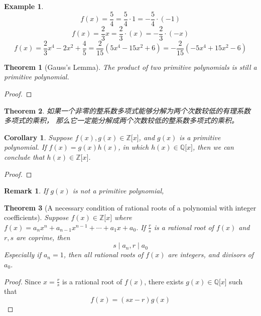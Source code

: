 \documentclass[onecolumn]{ctexart}
\newtheorem{theorem}{Theorem}
\newtheorem{corollary}{Corollary}
\newtheorem{remark}{Remark}
\newtheorem{example}{Example}
\begin{document}
\begin{example}
  \[
    f(x) = \frac{5}{4} = \frac{5}{4} \cdot 1 = -\frac{5}{4} \cdot (-1)
  \]
  \[
    f(x) = \frac{2}{3}x = \frac{2}{3} \cdot (x) = -\frac{2}{3} \cdot (-x)
  \]
  \[
    f(x) = \frac{2}{3}x^4 - 2x^2 + \frac{4}{5} = \frac{2}{15}(5x^4 - 15x^2 + 6) = -\frac{2}{15}(-5x^4 + 15x^2 - 6)
  \]
\end{example}

\begin{theorem}[Gauss's Lemma]
  The product of two primitive polynomials is still a primitive polynomial.
\end{theorem}
\begin{proof}
  
\end{proof}

\begin{theorem}
  如果一个非零的整系数多项式能够分解为两个次数较低的有理系数多项式的乘积，
  那么它一定能分解成两个次数较低的整系数多项式的乘积。
\end{theorem}

\begin{corollary}
  Suppose $f(x), g(x) \in \mathbb{Z}\lbrack x \rbrack$, and $g(x)$ is a 
  primitive polynomial. If $f(x) = g(x)h(x)$, in which $h(x) \in \mathbb{Q}
  \lbrack x \rbrack$, then we can conclude that $h(x) \in \mathbb{Z}\lbrack x 
  \rbrack$.
\end{corollary}
\begin{proof}
  
\end{proof}
\begin{remark}
  If $g(x)$ is not a primitive polynomial,
\end{remark}

\begin{theorem}[A necessary condition of rational roots of a polynomial with integer coefficients]
  Suppose $f(x) \in \mathbb{Z}\lbrack x \rbrack$ where $f(x) = a_n x^n + 
  a_{n-1} x^{n-1} + \cdots + a_1 x + a_0$. If $\frac{r}{s}$ is a rational root 
  of $f(x)$ and $r, s$ are coprime, then 
  \[
    s \mid a_n, r \mid a_0
  \]
  Especially if $a_n = 1$, then all rational roots of $f(x)$ are integers, and 
  divisors of $a_0$.
\end{theorem}
\begin{proof}
  Since $x = \frac{r}{s}$ is a rational root of $f(x)$, there exists $g(x) \in 
  \mathbb{Q}\lbrack x \rbrack$ such that
  \[
    f(x) = (sx - r)g(x)
  \]
\end{proof}
\end{document}
